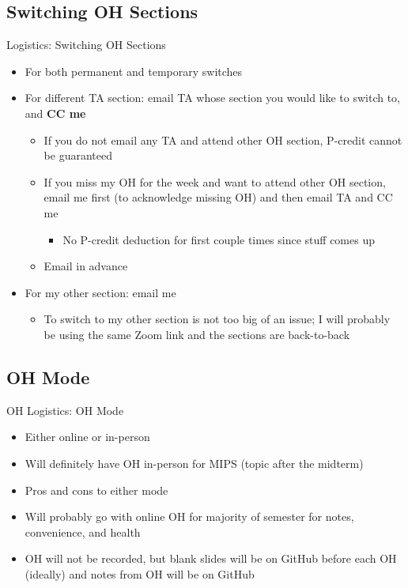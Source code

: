 \documentclass{../slides}
\begin{document}
\subsection{Switching OH Sections}
\begin{frame}{Logistics: Switching OH Sections}
    \begin{itemize}
        \item For both permanent and temporary switches
        \item For different TA section: email TA whose section you would like to switch to, and \textbf{CC me}
        \begin{itemize}
            \item If you do not email any TA and attend other OH section, P-credit cannot be guaranteed
            \item If you miss my OH for the week and want to attend other OH section, email me first (to acknowledge missing OH) and then email TA and CC me
            \begin{itemize}
                \item No P-credit deduction for first couple times since stuff comes up
            \end{itemize}
            \item Email in advance
        \end{itemize}
        \item For my other section: email me
        \begin{itemize}
            \item To switch to my other section is not too big of an issue; I will probably be using the same Zoom link and the sections are back-to-back
        \end{itemize}
    \end{itemize}
\end{frame}

\subsection{OH Mode}
\begin{frame}{OH Logistics: OH Mode}
    \begin{itemize}
        \item Either online or in-person
        \item Will definitely have OH in-person for MIPS (topic after the midterm)
        \item Pros and cons to either mode
        \item Will probably go with online OH for majority of semester for notes, convenience, and health
        \item OH will not be recorded, but blank slides will be on GitHub before each OH (ideally) and notes from OH will be on GitHub
    \end{itemize}
\end{frame}
\end{document}
